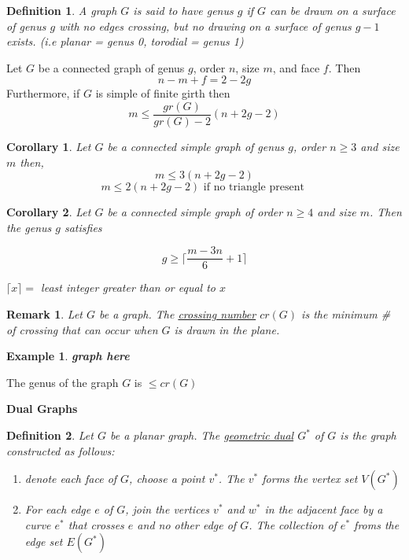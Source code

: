 \documentclass[12pt]{article}
\newenvironment{theorem}[1]{%
  \renewcommand\themanualtheoreminner{#1}%
  \manualtheoreminner
}{\endmanualtheoreminner}
\newtheorem*{corollary}{Corollary}
\newtheorem{example}{Example}
\newtheorem{definition}{Definition}
\newtheorem*{remark}{Remark}
\begin{document}
\begin{definition}
	A graph $G$ is said to have genus $g$ if $G$ can be drawn on a surface of genus $g$ with no edges crossing, but no drawing on a surface of genus $g-1$ exists. (i.e planar = genus 0, torodial = genus 1)
\end{definition}



\begin{theorem}{8}
	Let $G$ be a connected graph of genus $g$, order $n$, size $m$, and face $f$. Then
	\[n - m + f = 2-2g\]
	Furthermore, if $G$ is simple of finite girth then
	\[m \le \frac{gr(G)}{gr(G) - 2} (n + 2g - 2)\]
\end{theorem}

\begin{corollary}
	Let $G$ be a connected simple graph of genus $g$, order $n\ge 3$ and size $m$ then,
	\[m \le 3(n+2g-2) \]
	\[m \le 2(n+2g-2) \text{ if no triangle present }\]
\end{corollary}


\begin{corollary}
	Let $G$ be a connected simple graph of order $n\ge 4$ and size $m$. Then the genus $g$ satisfies

	\[g \ge \lceil \frac{m-3n}{6} + 1 \rceil\]

	$\lceil x \rceil =$ least integer greater than or equal to $x$
\end{corollary}

\begin{remark}
	Let $G$ be a graph. The \underline{crossing number} $cr(G)$ is the minimum \# of crossing that can occur when $G$ is drawn in the plane.
\end{remark}

\begin{example}
	\textbf{graph here}
\end{example}


\begin{theorem}{9}
	The genus of the graph $G$ is $\le cr(G)$
\end{theorem}


\textbf{Dual Graphs}

\begin{definition}
	Let $G$ be a planar graph. The \underline{geometric dual} $G^{*}$ of $G$ is the graph constructed as follows:
	\begin{enumerate}
		\item denote each face of $G$, choose a point $v^{*}$. The $v^{*}$ forms the vertex set $V(G^{*})$
		\item For each edge $e$ of $G$, join the vertices $v^{*}$ and $w^{*}$ in the adjacent face by a curve $e^{*}$ that crosses $e$ and no other edge of $G$. The collection of $e^{*}$ froms the edge set $E(G^{*})$
	\end{enumerate}

\end{definition}
\end{document}
